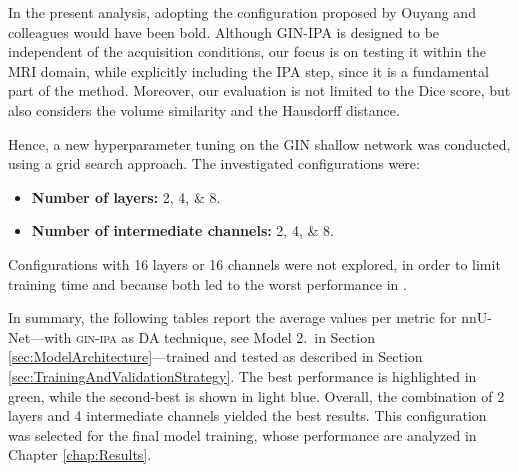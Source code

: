 In the present analysis, adopting the configuration proposed by Ouyang and colleagues would have been bold. Although GIN-IPA is designed to be independent of the acquisition conditions, our focus is on testing it within the MRI domain, while explicitly including the IPA step, since it is a fundamental part of the method. Moreover, our evaluation is not limited to the Dice score, but also considers the volume similarity and the Hausdorff distance.

Hence, a new hyperparameter tuning on the GIN shallow network was conducted, using a grid search approach. The investigated configurations were:
\begin{itemize}
    \item \textbf{Number of layers:} \numlist[list-final-separator = {, }]{2;4;8}.
    \item \textbf{Number of intermediate channels:} \numlist[list-final-separator = {, }]{2;4;8}.
\end{itemize}
Configurations with 16 layers or 16 channels were not explored, in order to limit training time and because both led to the worst performance in \cite{Ouyang2023}.

In summary, the following tables report the average values per metric for nnU-Net---with \textsc{gin-ipa} as DA technique, see Model 2.\ in Section \ref{sec:ModelArchitecture}---trained and tested as described in Section\,\ref{sec:TrainingAndValidationStrategy}. The best performance is highlighted in green, while the second-best is shown in light blue. Overall, the combination of \num{2} layers and \num{4} intermediate channels yielded the best results. This configuration was selected for the final model training, whose performance are analyzed in Chapter \ref{chap:Results}.

